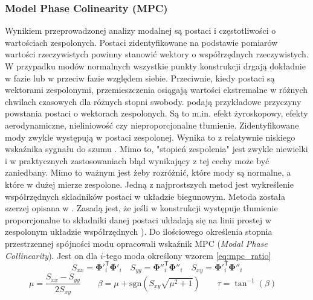 \subsubsection{Model Phase Colinearity (MPC)}
Wynikiem przeprowadzonej analizy modalnej są postaci i częstotliwości o wartościach zespolonych. Postaci zidentyfikowane na podstawie pomiarów wartości rzeczywistych powinny stanowić wektory o współrzędnych rzeczywistych. W przypadku modów normalnych wszystkie punkty konstrukcji drgają dokładnie w fazie lub w przeciw fazie względem siebie. Przeciwnie, kiedy postaci są wektorami zespolonymi, przemieszczenia osiągają wartości ekstremalne w różnych chwilach czasowych dla różnych stopni swobody. \cite{Ewins2000,Chopra2012a} podają przykładowe przyczyny powstania postaci o wektorach zespolonych. Są to m.in. efekt żyroskopowy, efekty aerodynamiczne, nieliniowość czy nieproporcjonalne tłumienie. Zidentyfikowane mody zwykle występują w postaci zespolonej. Wynika to z relatywnie niskiego wskaźnika sygnału do szumu \parencite{Rainieri2014}. Mimo to, "stopień zespolenia" jest zwykle niewielki i w praktycznych zastosowaniach błąd wynikający z tej cechy może być zaniedbany. Mimo to ważnym jest żeby rozróżnić, które mody są normalne, a które w dużej mierze zespolone. Jedną z najprostszych metod jest wykreślenie współrzędnych składników postaci w układzie biegunowym. Metoda została szerzej opisana w \parencite{Ewins2000}. Zasadą jest, że jeśli w konstrukcji występuje tłumienie proporcjonalne to składniki danej postaci układają się na linii prostej w zespolonym układzie współrzędnych \parencite{Rainieri2014}).
Do ilościowego określenia stopnia przestrzennej spójności modu \cite{Pappa1992} opracowali wskaźnik MPC (\textit{Modal Phase Collinearity}). Jest on dla $i$-tego moda określony wzorem \ref{eq:mpc_ratio}
\begin{equation}
	{S}_{xx}={\mathbf{\Phi}'}_{i}^{\mathsf{T}} {\mathbf{\Phi}} '_{i} \quad
	{S}_{yy}={\mathbf{\Phi}''}_{i}^{\mathsf{T}} {\mathbf{\Phi}}''_{i} \quad
	{S}_{xy}={\mathbf{\Phi}'}_{i}^{\mathsf{T}} {\mathbf{\Phi}}''_{i}
\end{equation}
\begin{equation}
	{\mu}=\frac{S_{xx}-S_{yy}}{2S_{xy}} \quad \quad
	\beta=\mu+\mathrm{sgn}(S_{xy}\sqrt{\mu^{2}+1}) \quad \quad
	\tau=\tan^{-1}{(\beta)} \quad
\end{equation}
